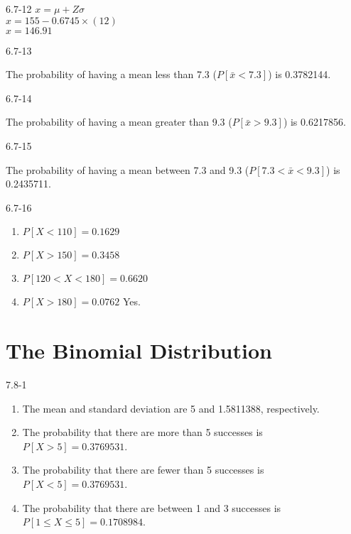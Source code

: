 \begin{exsol@solution}{6.7-12}
	    $x = \mu + Z \sigma$ \\
	    $x = 155 - 0.6745 \times (12) $ \\
	    $x = 146.91$

\end{exsol@solution}
\begin{exsol@solution}{6.7-13}


    The probability of having a mean less than 7.3 ($P[ \bar{x} < 7.3 ]$) is 0.3782144.

\end{exsol@solution}
\begin{exsol@solution}{6.7-14}


    The probability of having a mean greater than 9.3 ($P[ \bar{x} > 9.3 ]$) is 0.6217856.

\end{exsol@solution}
\begin{exsol@solution}{6.7-15}


    The probability of having a mean between 7.3 and  9.3 ($P[ 7.3 < \bar{x} < 9.3 ]$) is 0.2435711.

\end{exsol@solution}
\begin{exsol@solution}{6.7-16}
\begin{enumerate}
\item $P[ X < 110 ] = 0.1629 $
\item $P[ X > 150 ] = 0.3458 $
\item $P[ 120 < X < 180 ] = 0.6620 $
\item $P[ X > 180 ] = 0.0762 $ Yes.
\end{enumerate}

\end{exsol@solution}
\setcounter{chapter}{6}\chapter{The Binomial Distribution}
\begin{exsol@solution}{7.8-1}

		\begin{enumerate}
	  \item The mean and standard deviation are 5 and 1.5811388, respectively.
    \item The probability that there are more than 5 successes is $P[ X > 5 ] = 0.3769531$.
    \item The probability that there are fewer than 5 successes is $P[ X < 5 ] = 0.3769531$.
    \item The probability that there  are between 1 and 3 successes  is $P[ 1 \le X \le 5 ] = 0.1708984$.
	  \end{enumerate}
\end{exsol@solution}
